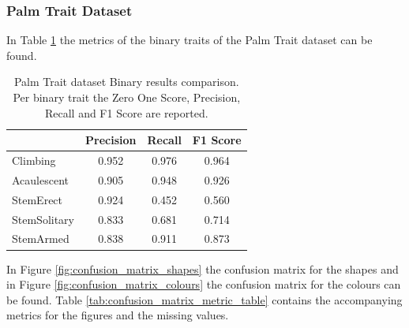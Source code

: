 \documentclass[a4paper, 12pt, oneside]{book} %
\begin{document}
\subsubsection{Palm Trait Dataset}
In Table \ref{tab:palm_trait_binary} the metrics of the binary traits of the Palm Trait dataset can be found.
\begin{table}[htpb]
\centering
\caption[Palm Trait dataset Binary results comparison]{Palm Trait dataset Binary results comparison. Per binary trait the Zero One Score, Precision, Recall and F1 Score are reported.}
\label{tab:palm_trait_binary}
\begin{tabular}{@{}lccc@{}}
\cmidrule(l){2-4}
             & \textbf{Precision} & \textbf{Recall} & \textbf{F1 Score} \\ \midrule
Climbing     & 0.952              & 0.976           & 0.964             \\ \midrule
Acaulescent  & 0.905              & 0.948           & 0.926             \\ \midrule
StemErect    & 0.924              & 0.452           & 0.560             \\ \midrule
StemSolitary & 0.833              & 0.681           & 0.714            \\ \midrule
StemArmed    & 0.838              & 0.911           & 0.873             \\ \bottomrule
\end{tabular}
\end{table}

In Figure \ref{fig:confusion_matrix_shapes} the confusion matrix for the shapes and in Figure \ref{fig:confusion_matrix_colours} the confusion matrix for the colours can be found.
Table \ref{tab:confusion_matrix_metric_table} contains the accompanying metrics for the figures and the missing values.
\end{document}
